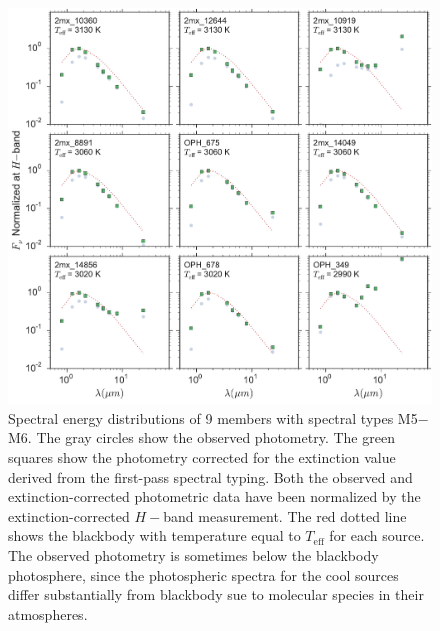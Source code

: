 \begin{figure}[ht!]
  \caption[Spectral energy distributions of nine members of \emph{Ophiuchus}]{Spectral energy distributions of 9 members with spectral types M5$-$M6.  The gray circles show the observed photometry.  The green squares show the photometry corrected for the extinction value derived from the first-pass spectral typing.  Both the observed and extinction-corrected photometric data have been normalized by the extinction-corrected $H-$band measurement.  The red dotted line shows the blackbody with temperature equal to $T_{\mathrm{eff}}$ for each source.  The observed photometry is sometimes below the blackbody photosphere, since the photospheric spectra for the cool sources differ substantially from blackbody sue to molecular species in their atmospheres.  \label{fig_SEDs_9panel} }
\centering
\includegraphics[scale=0.5]{chIMACS/figures/SEDS_9panel}
\end{figure}


